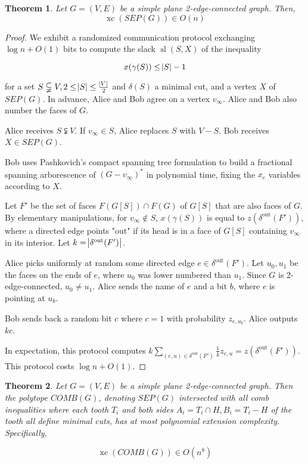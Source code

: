 \documentclass{article}
\newtheorem{theorem}{Theorem}
\DeclareMathOperator{\xc}{xc}
\DeclareMathOperator{\Sl}{sl}
\begin{document}
	\begin{theorem}
	Let $G=(V,E)$ be a simple plane 2-edge-connected graph. Then,
		$$\xc(SEP(G)) \in O(n)$$
	\end{theorem}
\begin{proof}
	We exhibit a randomized communication protocol exchanging
	$\log n + O(1)$ bits to compute the slack $\Sl(S, X)$ of the
	inequality

	$$x(\gamma(S)) \leq \abs{S}-1$$

	for a set $S\subsetneqq V, 2\leq \abs{S} \leq \frac{\abs{V}}{2}$
	and $\delta(S)$ a minimal cut,
	and a vertex $X$ of $SEP(G)$.
	In advance, Alice and Bob agree on a vertex $v_\infty$.
	Alice and Bob also number the faces of $G$.
	
	Alice receives $S\subsetneqq V$. 
	If $v_\infty\in S$, Alice replaces $S$ with $V-S$.
	Bob receives $X\in SEP(G)$.

	Bob uses Pashkovich's compact spanning tree formulation to build 
	a fractional spanning arborescence of $(G-v_\infty)^*$
	in polynomial time, fixing the $x_e$ variables according to $X$.

	Let $F'$ be the set of faces $F(G[S])\cap F(G)$ 
	of  $G[S]$ that are also faces of $G$.
	By elementary manipulations, for $v_\infty\not\in S$, $x(\gamma(S))$ is equal to $z(\delta^{\text{out}}(F'))$, where a directed edge points "out" if its head is in a face of $G[S]$
	containing $v_\infty$ in its interior.
	Let $k=\abs{\delta^{\text{out}}(F')}$.

	Alice picks uniformly at random some directed edge $e\in \delta^{\text{out}}(F')$. 
	Let $u_0,u_1$ be the faces on the ends of $e$, where
	$u_0$ was lower numbered than $u_1$. Since
	$G$ is 2-edge-connected, $u_0\neq u_1$.
	Alice sends
	the name of $e$ and a bit $b$, where $e$ is pointing at $u_b$.

	Bob sends back a random bit $c$ where $c=1$ with probability $z_{e,u_b}$.
	Alice outputs $kc$.

	In expectation, this protocol computes $k\sum_{(e,u)\in\delta^{\text{out}}(F')} \frac{1}{k} z_{e,u} = z(\delta^{\text{out}}(F'))$. This protocol costs $\log n + O(1)$.
\end{proof}

\begin{theorem}
	Let $G=(V,E)$ be a simple plane 2-edge-connected graph. Then
	the polytope $COMB(G)$, denoting $SEP(G)$ intersected
	with all comb inequalities where each tooth $T_i$ 
	and both sides $A_i = T_i\cap H, B_i = T_i - H$ 
	of the tooth all define minimal cuts,
	has at most polynomial extension complexity. Specifically,

	$$\xc(COMB(G)) \in O(n^8)$$
\end{theorem}
\end{document}
